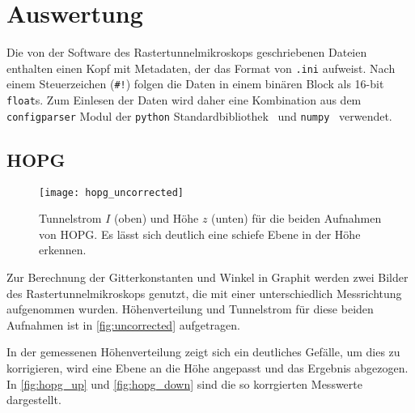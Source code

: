\section{Auswertung}
\label{sec:Auswertung}

Die von der Software des Rastertunnelmikroskops geschriebenen Dateien enthalten einen Kopf mit Metadaten, der das Format von \texttt{.ini} aufweist.
Nach einem Steuerzeichen (\texttt{\#!}) folgen die Daten in einem binären Block als 16-bit \texttt{float}s.
Zum Einlesen der Daten wird daher eine Kombination aus dem \texttt{configparser} Modul der \texttt{python} Standardbibliothek~\cite{configparser} und \texttt{numpy}~\cite{numpy} verwendet.~\cite{readnid}

\subsection{HOPG}
\begin{figure}
  \centering
  \texttt{[image: hopg\_uncorrected]}
  \caption{%
    Tunnelstrom $I$ (oben) und Höhe $z$ (unten) für die beiden Aufnahmen von HOPG.
    Es lässt sich deutlich eine schiefe Ebene in der Höhe erkennen.%
  }\label{fig:uncorrected}
\end{figure}

Zur Berechnung der Gitterkonstanten und Winkel in Graphit werden zwei Bilder des Rastertunnelmikroskops genutzt, die mit einer unterschiedlich Messrichtung aufgenommen wurden.
Höhenverteilung und Tunnelstrom für diese beiden Aufnahmen ist in \autoref{fig:uncorrected} aufgetragen.

In der gemessenen Höhenverteilung zeigt sich ein deutliches Gefälle, um dies zu korrigieren, wird eine Ebene an die Höhe angepasst und das Ergebnis abgezogen.
In \autoref{fig:hopg_up} und \autoref{fig:hopg_down} sind die so korrgierten Messwerte dargestellt.

